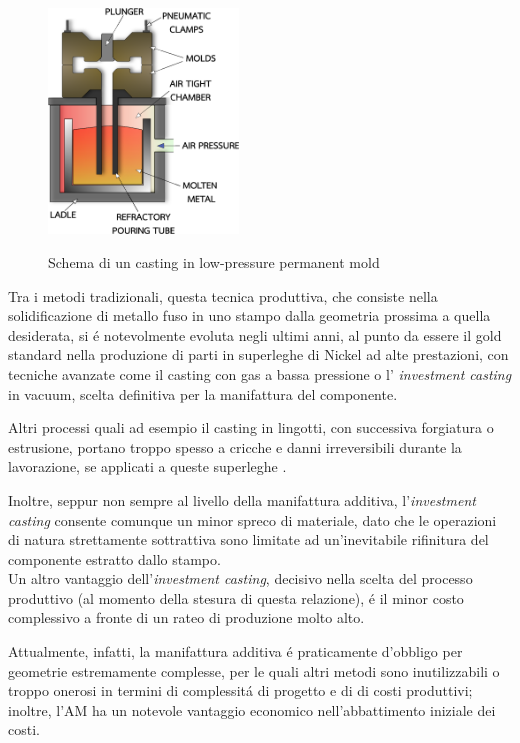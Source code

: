 \documentclass{article}
\begin{document}
    \begin{figure}[h!]
        \centering
         \label{low_press_mold}
        \includegraphics[width=0.45\textwidth]{Sources/pressurized_mold.eps}
        \caption{Schema di un casting in low-pressure permanent mold \autocite{Inkscape}}
    \end{figure}


    Tra i metodi tradizionali, questa tecnica produttiva, che consiste nella solidificazione di metallo fuso
    in uno stampo dalla geometria prossima a quella desiderata, si é notevolmente evoluta negli ultimi anni,
    al punto da essere il gold standard nella
    produzione di parti in superleghe di Nickel ad alte prestazioni, con tecniche avanzate come il casting con
    gas a bassa pressione o l' \textit{investment casting} in vacuum, scelta definitiva per la manifattura del componente. 

    Altri processi quali ad esempio il casting in lingotti, con successiva forgiatura o estrusione,
    portano troppo spesso a cricche e danni irreversibili durante la lavorazione, se applicati a queste superleghe \autocite{Mouritz}.

    Inoltre, seppur non sempre al livello della manifattura additiva, l'\textit{investment casting} consente comunque un minor spreco 
    di materiale, dato che le operazioni di natura strettamente sottrattiva sono limitate ad un'inevitabile
    rifinitura del componente estratto dallo stampo. \\ 

    Un altro vantaggio dell'\textit{investment casting}, decisivo nella scelta del processo
    produttivo (al momento della stesura di questa relazione), é il minor costo complessivo a fronte
    di un rateo di produzione molto alto. 

    Attualmente, infatti, la manifattura additiva é praticamente d'obbligo per geometrie estremamente complesse, 
    per le quali altri metodi sono inutilizzabili o troppo onerosi in termini di complessitá di progetto e di  
    di costi produttivi; inoltre, l'AM ha un notevole vantaggio economico nell'abbattimento iniziale dei costi.
\end{document}
